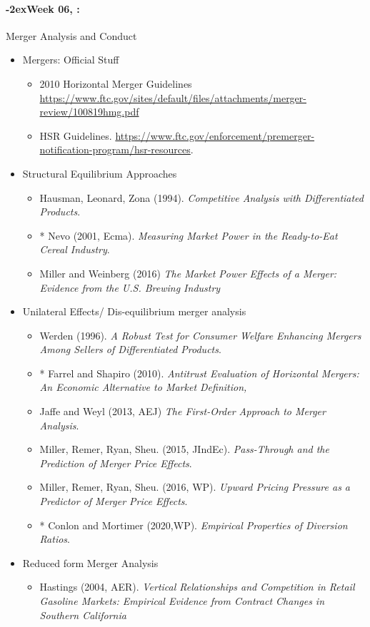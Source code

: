 \documentclass[11pt]{article}
\newcommand{\week}[1]{%
  \paragraph*{\kern-2ex\quad #1, \syldate{\today}:}%
  \ifdim\wd1=\wd\THURSDAY
    \AdvanceDate[7]
  \else
    \AdvanceDate[7]
  \fi%
}
\begin{document}
\week{Week 06} Merger Analysis and Conduct 
\begin{itemize}
\item Mergers: Official Stuff
\begin{itemize}
\item 2010 Horizontal Merger Guidelines \url{https://www.ftc.gov/sites/default/files/attachments/merger-review/100819hmg.pdf}
\item HSR Guidelines. \url{https://www.ftc.gov/enforcement/premerger-notification-program/hsr-resources}.
\end{itemize}
\item Structural Equilibrium Approaches
\begin{itemize}
\item Hausman, Leonard, Zona (1994). \textit{Competitive Analysis with Differentiated Products}.
\item * Nevo (2001, Ecma). \textit{Measuring Market Power in the Ready-to-Eat Cereal Industry}.
\item Miller and Weinberg (2016) \textit{The Market Power Effects of a Merger: Evidence from the U.S. Brewing Industry}
\end{itemize}
\item Unilateral Effects/ Dis-equilibrium merger analysis
\begin{itemize}
\item Werden (1996). \textit{A Robust Test for Consumer Welfare Enhancing
Mergers Among Sellers of Differentiated Products}.
\item * Farrel and Shapiro (2010). \textit{Antitrust Evaluation of Horizontal Mergers: An Economic Alternative to Market Definition,}
\item Jaffe and Weyl (2013, AEJ) \textit{The First-Order Approach to Merger Analysis}.
\item Miller, Remer, Ryan, Sheu. (2015, JIndEc). \textit{Pass-Through and the Prediction of Merger Price Effects}.
\item Miller, Remer, Ryan, Sheu. (2016, WP). \textit{Upward Pricing Pressure as a Predictor of Merger Price Effects}.
\item * Conlon and Mortimer (2020,WP). \textit{Empirical Properties of Diversion Ratios}.
\end{itemize}
\item Reduced form Merger Analysis
\begin{itemize}
\item Hastings (2004, AER). \textit{Vertical Relationships and Competition in Retail Gasoline Markets: Empirical Evidence from Contract Changes in Southern California}

\end{itemize}
\end{itemize}
\end{document}

